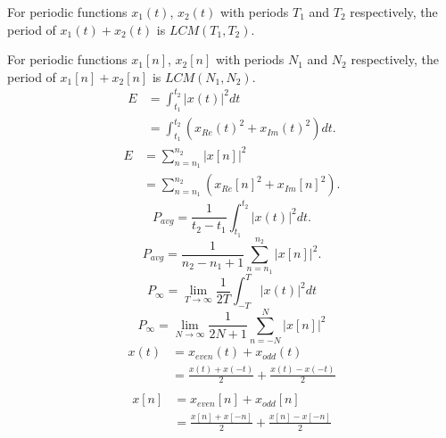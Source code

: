 \documentclass[8pt]{article}
\begin{document}

For periodic functions \(x_1(t)\), \(x_2(t)\) with periods \(T_1\) and
\(T_2\) respectively, the period of \(x_1(t) + x_2(t)\) is \(LCM(T_1, T_2)\).

For periodic functions \(x_1[n]\), \(x_2[n]\) with periods \(N_1\) and
\(N_2\) respectively, the period of \(x_1[n] + x_2[n]\) is \(LCM(N_1, N_2)\).
\begin{align*}
    E & = \int_{t_1}^{t_2} |x(t)|^2 dt                     \\
      & = \int_{t_1}^{t_2} (x_{Re}(t)^2 + x_{Im}(t)^2) dt.
\end{align*}
\begin{align*}
    E & = \sum_{n=n_1}^{n_2} |x[n]|^2                     \\
      & = \sum_{n=n_1}^{n_2} (x_{Re}[n]^2 + x_{Im}[n]^2).
\end{align*}
\begin{equation*}
    P_{avg} = \frac{1}{t_2 - t_1} \int_{t_1}^{t_2} |x(t)|^2 dt.
\end{equation*}
\begin{equation*}
    P_{avg} = \frac{1}{n_2 - n_1 + 1} \sum_{n=n_1}^{n_2} |x[n]|^2.
\end{equation*}
\begin{equation*}
    P_{\infty} = \lim_{T \rightarrow \infty} \frac{1}{2T} \int_{-T}^{T} |x(t)|^2 dt
\end{equation*}
\begin{equation*}
    P_{\infty} = \lim_{N \rightarrow \infty} \frac{1}{2N + 1} \sum_{n=-N}^{N} |x[n]|^2
\end{equation*}
\begin{align*}
    x(t) & = x_{even}(t) + x_{odd}(t)                        \\
         & = \frac{x(t) + x(-t)}{2} + \frac{x(t) - x(-t)}{2} \\
\end{align*}
\begin{align*}
    x[n] & = x_{even}[n] + x_{odd}[n]                        \\
         & = \frac{x[n] + x[-n]}{2} + \frac{x[n] - x[-n]}{2} \\
\end{align*}
\end{document}
